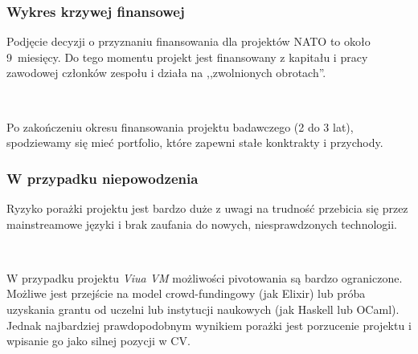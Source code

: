 \documentclass{beamer}
\begin{document}
\begin{frame}
    \frametitle{Wykres krzywej finansowej}

    Podjęcie decyzji o przyznaniu finansowania dla projektów NATO to około
    9~miesięcy. Do tego momentu projekt jest finansowany z kapitału i pracy
    zawodowej członków zespołu i działa na ,,zwolnionych obrotach''.

    ~

    Po zakończeniu okresu finansowania projektu badawczego (2 do 3 lat),
    spodziewamy się mieć portfolio, które zapewni stałe konktrakty i przychody.
\end{frame}

\begin{frame}
    \frametitle{W przypadku niepowodzenia}

    Ryzyko porażki projektu jest bardzo duże z uwagi na trudność przebicia się
    przez mainstreamowe języki i brak zaufania do nowych, niesprawdzonych
    technologii.

    ~

    W przypadku projektu \emph{Viua VM} możliwości pivotowania są bardzo
    ograniczone. Możliwe jest przejście na model crowd-fundingowy (jak
    Elixir) lub próba uzyskania grantu od uczelni lub instytucji naukowych (jak
    Haskell lub OCaml). Jednak najbardziej prawdopodobnym wynikiem porażki jest
    porzucenie projektu i wpisanie go jako silnej pozycji w CV.
\end{frame}
\end{document}
